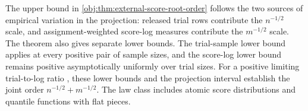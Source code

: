 The upper bound in \cref{obj:thm:external-score-root-order} follows the two sources of empirical variation in the projection: released trial rows contribute the \(n^{-1/2}\) scale, and assignment-weighted score-log measures contribute the \(m^{-1/2}\) scale. The theorem also gives separate lower bounds. The trial-sample lower bound applies at every positive pair of sample sizes, and the score-log lower bound remains positive asymptotically uniformly over trial sizes. For a positive limiting trial-to-log ratio , these lower bounds and the projection interval establish the joint order \(n^{-1/2}+m^{-1/2}\). The law class includes atomic score distributions and quantile functions with flat pieces.
